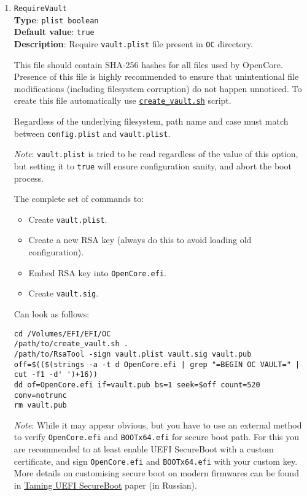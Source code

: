 \documentclass[]{article}
\providecommand{\tightlist}{%
  \setlength{\itemsep}{0pt}\setlength{\parskip}{0pt}}
\begin{document}
\begin{enumerate}
\item
  \texttt{RequireVault}\\
  \textbf{Type}: \texttt{plist\ boolean}\\
  \textbf{Default value}: \texttt{true}\\
  \textbf{Description}: Require \texttt{vault.plist} file present
  in \texttt{OC} directory.

  This file should contain SHA-256 hashes for all files used by OpenCore.
  Presence of this file is highly recommended to ensure that unintentional
  file modifications (including filesystem corruption) do not happen unnoticed.
  To create this file automatically use
  \href{https://github.com/acidanthera/OcSupportPkg/tree/master/Tools/Vault}{\texttt{create\_vault.sh}} script.

  Regardless of the underlying filesystem, path name and case must match
  between \texttt{config.plist} and \texttt{vault.plist}.

  \emph{Note}: \texttt{vault.plist} is tried to be read regardless of the value
  of this option, but setting it to \texttt{true} will ensure configuration
  sanity, and abort the boot process.

  The complete set of commands to:

  \begin{itemize}
  \tightlist
  \item Create \texttt{vault.plist}.
  \item Create a new RSA key (always do this to avoid loading old configuration).
  \item Embed RSA key into \texttt{OpenCore.efi}.
  \item Create \texttt{vault.sig}.
  \end{itemize}

  Can look as follows:
\begin{lstlisting}[label=createvault, style=ocbash]
cd /Volumes/EFI/EFI/OC
/path/to/create_vault.sh .
/path/to/RsaTool -sign vault.plist vault.sig vault.pub
off=$(($(strings -a -t d OpenCore.efi | grep "=BEGIN OC VAULT=" | cut -f1 -d' ')+16))
dd of=OpenCore.efi if=vault.pub bs=1 seek=$off count=520 conv=notrunc
rm vault.pub
\end{lstlisting}

  \emph{Note}: While it may appear obvious, but you have to use an external
  method to verify \texttt{OpenCore.efi} and \texttt{BOOTx64.efi} for
  secure boot path. For this you are recommended to at least enable UEFI SecureBoot
  with a custom certificate, and sign \texttt{OpenCore.efi} and \texttt{BOOTx64.efi}
  with your custom key. More details on customising secure boot on modern firmwares
  can be found in \href{https://habr.com/post/273497/}{Taming UEFI SecureBoot}
  paper (in Russian).

\end{enumerate}
\end{document}
